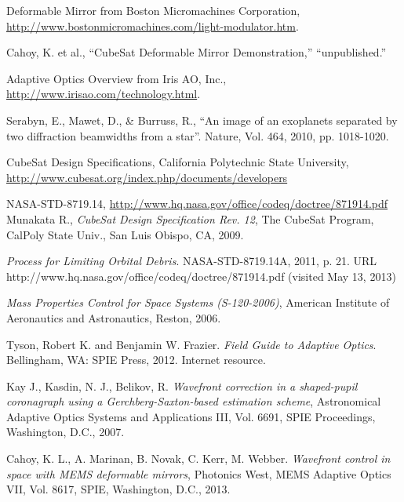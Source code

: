 \documentclass[12pt]{article}
\begin{document}
\begin{thebibliography}{9}




Deformable Mirror from Boston Micromachines Corporation, \url{http://www.bostonmicromachines.com/light-modulator.htm}.

Cahoy, K. et al., ``CubeSat Deformable Mirror Demonstration,'' ``unpublished.''

Adaptive Optics Overview from Iris AO, Inc., \url{http://www.irisao.com/technology.html}.

Serabyn, E., Mawet, D., \& Burruss, R., ``An image of an exoplanets separated by two diffraction beamwidths from a star''. Nature, Vol. 464, 2010, pp. 1018-1020.

CubeSat Design Specifications, California Polytechnic State University, \url{http://www.cubesat.org/index.php/documents/developers}

NASA-STD-8719.14, \url{http://www.hq.nasa.gov/office/codeq/doctree/871914.pdf}
Munakata R., \emph{CubeSat Design Specification Rev. 12}, The CubeSat Program, CalPoly State Univ., San Luis Obispo, CA, 2009.

\emph{Process for Limiting Orbital Debris}. NASA-STD-8719.14A, 2011, p. 21. URL http://www.hq.nasa.gov/office/codeq/doctree/871914.pdf (visited May 13, 2013)

\emph{Mass Properties Control for Space Systems (S-120-2006)}, American Institute of Aeronautics and Astronautics, Reston, 2006.


   Tyson, Robert K. and Benjamin W. Frazier. 
   \emph{Field Guide to Adaptive Optics}. Bellingham, WA: SPIE Press,
   2012.  Internet resource.

   Kay J., Kasdin, N. J., Belikov, R.
   \emph{Wavefront correction in a shaped-pupil coronagraph using a Gerchberg-Saxton-based estimation scheme}, Astronomical Adaptive Optics Systems and Applications III, Vol. 6691, SPIE Proceedings, Washington, D.C., 2007.

   Cahoy, K. L., A. Marinan, B. Novak, C. Kerr, M. Webber. 
   \emph{Wavefront control in space with MEMS deformable mirrors},
   Photonics West, MEMS Adaptive Optics VII, Vol. 8617, SPIE,
   Washington, D.C., 2013.


\end{thebibliography}
\end{document}
